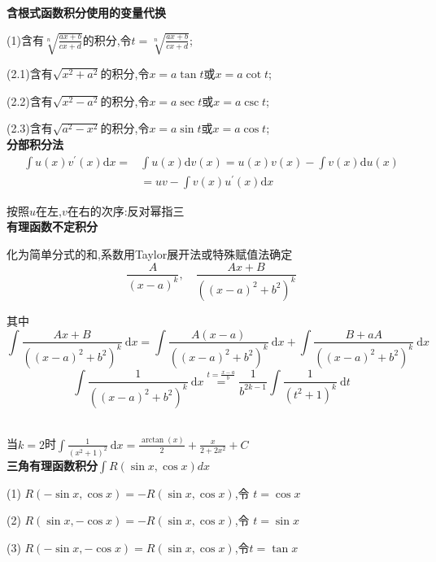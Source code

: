 \documentclass[UTF8]{ctexart}
\begin{document}
\noindent \textbf{含根式函数积分使用的变量代换}\par 
(1)含有$\sqrt[n]{\frac{ax+b}{cx+d}}$的积分,令$t=\sqrt[n]{\frac{a x+b}{c x+d}}$;\par 
(2.1)含有$\sqrt{x^{2}+a^{2}}$的积分,令$x=a \tan t$或$x=a \cot t$;\par 
(2.2)含有$\sqrt{x^{2}-a^{2}}$的积分,令$x=a \sec t$或$x=a \csc t$;\par 
(2.3)含有$\sqrt{a^{2}-x^{2}}$的积分,令$x=a \sin t$或$x=a \cos t$;\\

\noindent \textbf{分部积分法}
$$\begin{aligned}
	\int u(x) v^{\prime}(x) \mathrm{d} x=& \int u(x) \mathrm{d} v(x)=u(x) v(x)-\int v(x) \mathrm{d} u(x) \\
	&=u v-\int v(x) u^{\prime}(x) \mathrm{d} x
\end{aligned}$$
\par 按照$u$在左,$v$在右的次序:反对幂指三\\

\noindent \textbf{有理函数不定积分}\par
化为简单分式的和,系数用Taylor展开法或特殊赋值法确定
$$\frac{A}{(x-a)^{k}}, \quad \frac{A x+B}{\left((x-a)^{2}+b^{2}\right)^{k}}$$

其中
$$\int \frac{A x+B}{\left((x-a)^{2}+b^{2}\right)^{k}} \mathrm{~d} x 
= \int \frac{A(x-a)}{\left((x-a)^{2}+b^{2}\right)^{k}} \mathrm{~d} x+\int \frac{B+a A}{\left((x-a)^{2}+b^{2}\right)^{k}} \mathrm{~d} x $$
$$\int \frac{1}{\left((x-a)^{2}+b^{2}\right)^{k}} \mathrm{~d} x \stackrel{t=\frac{x-a}{b}}{=} \frac{1}{b^{2 k-1}} \int \frac{1}{\left(t^{2}+1\right)^{k}} \mathrm{~d} t$$\\
\par 当$k=2$时$\int \frac{1}{\left(x^{2}+1\right)^{2}} \mathrm{~d} x=\frac{\arctan(x)}{2}+\frac{x}{2+2x^2}+C$\\

\noindent \textbf{三角有理函数积分}$\int R(\sin x, \cos x) dx$\par 
(1) $R(-\sin x, \cos x)=-R(\sin x, \cos x)$,令 $t=\cos x $\par 
(2) $R(\sin x,-\cos x)=-R(\sin x, \cos x)$,令 $t=\sin x $\par 
(3) $R(-\sin x,-\cos x)=R(\sin x, \cos x)$,令$t=\tan x$\\
\end{document}
